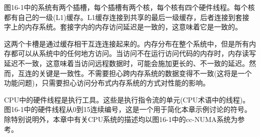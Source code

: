 图16-1中的系统有两个插槽，每个插槽有两个核，每个核有四个硬件线程。每个核都有自己的一级(L1)缓存。L1缓存连接到共享的最后一级缓存，后者连接到套接字上的内存系统。套接字内的内存访问延迟是一致的，这意味着它是一致的。\par

这两个卡槽是通过缓存相干互连连接起来的。内存分布在整个系统中，但是所有内存都可以从系统中的任何地方访问。当访问不在运行访问代码的内存时，内存读写延迟不一致，这意味着当访问远程数据时，可能会施加更长的、不一致的延迟。然而，互连的关键是一致性。不需要担心跨内存系统的数据变得不一致(这将是一个功能问题)，只需要担心访问分布式内存系统的方式对性能的影响。\par

CPU中的硬件线程是执行工具。这些是执行指令流的单元(CPU术语中的线程)。图16-1中的硬件线程从0到15连续编号，这是一个用于简化本章示例讨论的符号。除特别说明外，本章中有关CPU系统的描述均以图16-1中的cc-NUMA系统为参考。\par




























































